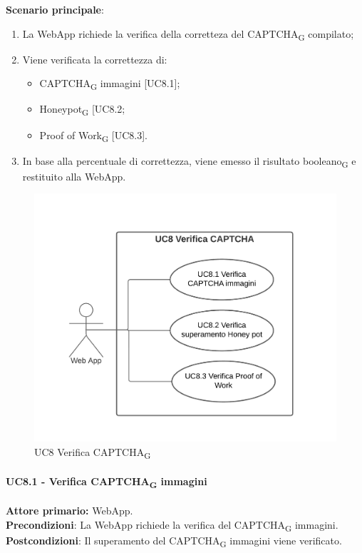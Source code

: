 \textbf{Scenario principale}:
\begin{enumerate}
    \item La WebApp richiede la verifica della corretteza del CAPTCHA\textsubscript{G} compilato;
    \item Viene verificata la correttezza di:
    \begin{itemize}
		\item CAPTCHA\textsubscript{G} immagini [UC8.1];
		\item Honeypot\textsubscript{G} [UC8.2;
		\item Proof of Work\textsubscript{G} [UC8.3].
    \end{itemize}
    \item In base alla percentuale di correttezza, viene emesso il risultato booleano\textsubscript{G} e restituito alla WebApp.
\end{enumerate}

\begin{figure}[H]
    \centering
    \includegraphics[scale=0.6]{img/verifica_captcha.png}
    \caption{UC8 Verifica CAPTCHA\textsubscript{G}}
\end{figure}

\paragraph{UC8.1 - Verifica CAPTCHA\textsubscript{G} immagini}
\textbf{Attore primario:} WebApp.\\
\textbf{Precondizioni}: La WebApp richiede la verifica del CAPTCHA\textsubscript{G} immagini.\\
\textbf{Postcondizioni}: Il superamento del CAPTCHA\textsubscript{G} immagini viene verificato.\\

